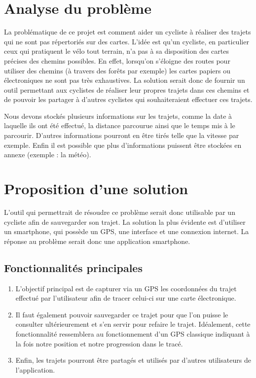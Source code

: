 \section{Analyse du problème}
La problématique de ce projet est comment aider un cycliste à réaliser des trajets qui ne sont pas répertoriés sur des cartes. L'idée est qu'un cycliste, 
en particulier ceux qui pratiquent le vélo tout terrain, n'a pas à sa disposition des cartes précises des chemins possibles. En effet,
lorsqu'on s'éloigne des routes pour utiliser des chemins (à travers des forêts par exemple) les cartes papiers ou électroniques ne sont pas
très exhaustives. La solution serait donc de fournir un outil permettant aux cyclistes de réaliser leur propres trajets dans ces
chemins et de pouvoir les partager à d'autres cyclistes qui souhaiteraient effectuer ces trajets.
\par
Nous devons stockés plusieurs informations sur les trajets, comme la date à laquelle ils ont été effectué, la distance parcourue ainsi que le temps mis à le parcourir. D'autres informations pourront en être tirés telle que la vitesse par exemple.
Enfin il est possible que plus d'informations puissent être stockées en annexe (exemple : la météo).
\section{Proposition d'une solution}
L'outil qui permettrait de résoudre ce problème serait donc utilisable par un cycliste afin de sauvegarder son trajet. La solution la plus évidente
est d'utiliser un smartphone, qui possède un GPS, une interface et une connexion internet. La réponse au problème serait donc une application
smartphone.

\subsection{Fonctionnalités principales}
\begin{enumerate}
  \item L'objectif principal est de capturer via un GPS les coordonnées du trajet effectué par l'utilisateur afin de tracer celui-ci sur une carte
  électronique.
  \item Il faut également pouvoir sauvegarder ce trajet pour que l'on puisse le consulter ultérieurement et s'en servir pour refaire le trajet.
  Idéalement, cette fonctionnalité ressemblera au fonctionnement d'un GPS classique indiquant à la fois notre position et notre progression dans le tracé.
  \item Enfin, les trajets pourront être partagés et utilisés par d'autres utilisateurs de l'application.
\end{enumerate}

